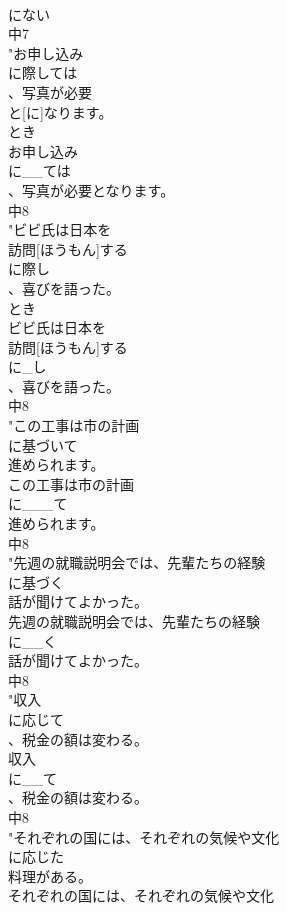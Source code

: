 \documentclass[8pt]{extreport}
\begin{document}
\begin{CJK}{UTF8}{min}
\\	にない
\\	中7
\\	"お申し込み
\\	に際しては
\\	、写真が必要
\\	と[に]なります。
\\	とき 
\\	お申し込み
\\	に__ては
\\	、写真が必要となります。
\\	中8
\\	"ビビ氏は日本を
\\	訪問[ほうもん]する
\\	に際し
\\	、喜びを語った。
\\	とき 
\\	ビビ氏は日本を
\\	訪問[ほうもん]する
\\	に_し
\\	、喜びを語った。
\\	中8
\\	"この工事は市の計画
\\	に基づいて
\\	進められます。
\\	この工事は市の計画
\\	に___て
\\	進められます。
\\	中8
\\	"先週の就職説明会では、先輩たちの経験
\\	に基づく
\\	話が聞けてよかった。
\\	先週の就職説明会では、先輩たちの経験
\\	に__く
\\	話が聞けてよかった。
\\	中8
\\	"収入
\\	に応じて
\\	、税金の額は変わる。
\\	収入
\\	に__て
\\	、税金の額は変わる。
\\	中8
\\	"それぞれの国には、それぞれの気候や文化
\\	に応じた
\\	料理がある。
\\	それぞれの国には、それぞれの気候や文化

\end{CJK}
\end{document}
